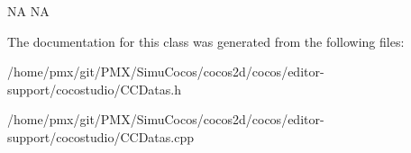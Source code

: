 NA  NA 

The documentation for this class was generated from the following files\+:\begin{DoxyCompactItemize}
\item 
/home/pmx/git/\+P\+M\+X/\+Simu\+Cocos/cocos2d/cocos/editor-\/support/cocostudio/C\+C\+Datas.\+h\item 
/home/pmx/git/\+P\+M\+X/\+Simu\+Cocos/cocos2d/cocos/editor-\/support/cocostudio/C\+C\+Datas.\+cpp\end{DoxyCompactItemize}
